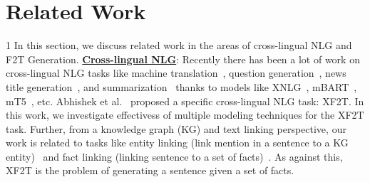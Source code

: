 \documentclass[runningheads]{llncs}
\def\arxiv{1}
\begin{document}
\section{Related Work}
\label{sec:relatedWork}
\if\arxiv1
In this section, we discuss related work in the areas of cross-lingual NLG and F2T Generation.
\fi
\noindent\underline{\textbf{Cross-lingual NLG}}: 
Recently there has been a lot of work on cross-lingual NLG tasks like machine translation~\cite{chi2021mt6,liu2020multilingual}, question generation~\cite{chi2020cross}, news title generation~\cite{liang2020xglue}, and  summarization~\cite{zhu2019ncls} thanks to models like XNLG~\cite{chi2020cross}, mBART~\cite{liu2020multilingual}, mT5~\cite{xue2021mt5}, etc. Abhishek et al.~\cite{abhishek2022xalign} proposed a specific cross-lingual NLG task: XF2T. In this work, we investigate effectivess of multiple modeling techniques for the XF2T task. Further, from a knowledge graph (KG) and text linking perspective, our work is related to tasks like entity linking (link mention in a sentence to a KG entity)~\cite{botha2020entity} and fact linking (linking sentence to a set of facts)~\cite{kolluru2021multilingual}. As against this, XF2T is the problem of generating a sentence given a set of facts.
\end{document}
